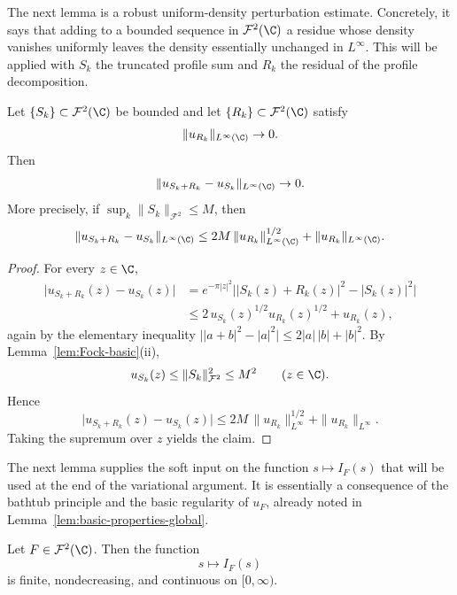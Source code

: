 The next lemma is a robust uniform-density perturbation estimate. Concretely,
it says that adding to a bounded sequence in \(\mathcal F^2(\C)\) a residue
whose density vanishes uniformly leaves the density essentially unchanged in
\(L^\infty\). This will be applied with \(S_k\) the truncated profile sum and
\(R_k\) the residual of the profile decomposition.

\begin{lemma}\label{lem:density-perturbation-global}
Let \(\{S_k\}\subset \mathcal F^2(\C)\) be bounded and let
\(\{R_k\}\subset \mathcal F^2(\C)\) satisfy
\[
\|u_{R_k}\|_{L^\infty(\C)}\to 0.
\]
Then
\[
\|u_{S_k+R_k}-u_{S_k}\|_{L^\infty(\C)}\to 0.
\]
More precisely, if \(\sup_k \|S_k\|_{\mathcal F^2}\le M\), then
\[
\|u_{S_k+R_k}-u_{S_k}\|_{L^\infty(\C)}
\le
2M\,\|u_{R_k}\|_{L^\infty(\C)}^{1/2}
+\|u_{R_k}\|_{L^\infty(\C)}.
\]
\end{lemma}

\begin{proof}
For every \(z\in \C\),
\begin{align*}
\big|u_{S_k+R_k}(z)-u_{S_k}(z)\big|
&=
e^{-\pi |z|^2}\big||S_k(z)+R_k(z)|^2-|S_k(z)|^2\big| \\
&\le
2\,u_{S_k}(z)^{1/2}u_{R_k}(z)^{1/2}
+u_{R_k}(z),
\end{align*}
again by the elementary inequality
\(\big||a+b|^2-|a|^2\big|\le 2|a|\,|b|+|b|^2\). By
Lemma~\ref{lem:Fock-basic}(ii),
\[
u_{S_k}(z)\le \|S_k\|_{\mathcal F^2}^2\le M^2
\qquad (z\in\C).
\]
Hence
\[
\big|u_{S_k+R_k}(z)-u_{S_k}(z)\big|
\le
2M\,\|u_{R_k}\|_{L^\infty}^{1/2}
+\|u_{R_k}\|_{L^\infty}.
\]
Taking the supremum over \(z\) yields the claim.
\end{proof}

The next lemma supplies the soft input on the function \(s\mapsto I_F(s)\)
that will be used at the end of the variational argument. It is essentially a
consequence of the bathtub principle and the basic regularity of \(u_F\),
already noted in Lemma~\ref{lem:basic-properties-global}.

\begin{lemma}\label{lem:I-continuity-global}
Let \(F\in \mathcal F^2(\C)\). Then the function
\[
s\mapsto I_F(s)
\]
is finite, nondecreasing, and continuous on \([0,\infty)\).
\end{lemma}

